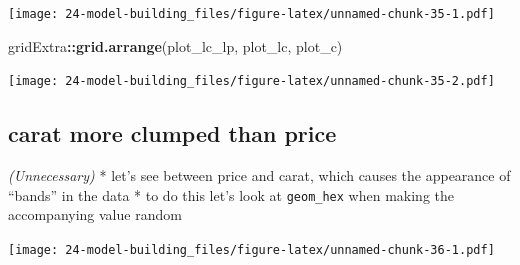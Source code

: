 \documentclass[]{book}
\newenvironment{Shaded}{\begin{snugshade}}{\end{snugshade}}
\newcommand{\DataTypeTok}[1]{\textcolor[rgb]{0.13,0.29,0.53}{#1}}
\newcommand{\KeywordTok}[1]{\textcolor[rgb]{0.13,0.29,0.53}{\textbf{#1}}}
\newcommand{\NormalTok}[1]{#1}
\newcommand{\OperatorTok}[1]{\textcolor[rgb]{0.81,0.36,0.00}{\textbf{#1}}}
\newcommand{\OtherTok}[1]{\textcolor[rgb]{0.56,0.35,0.01}{#1}}
\newcommand{\StringTok}[1]{\textcolor[rgb]{0.31,0.60,0.02}{#1}}
\theoremstyle{definition}
\theoremstyle{definition}
\theoremstyle{definition}
\theoremstyle{remark}
\begin{document}
\texttt{[image: 24-model-building\_files/figure-latex/unnamed-chunk-35-1.pdf]}

\begin{Shaded}
\begin{Highlighting}[]
\NormalTok{gridExtra}\OperatorTok{::}\KeywordTok{grid.arrange}\NormalTok{(plot_lc_lp, plot_lc, plot_c)}
\end{Highlighting}
\end{Shaded}

\texttt{[image: 24-model-building\_files/figure-latex/unnamed-chunk-35-2.pdf]}

\hypertarget{carat-more-clumped-than-price}{%
\subsection{carat more clumped than
price}\label{carat-more-clumped-than-price}}

\emph{(Unnecessary)} * let's see between price and carat, which causes
the appearance of ``bands'' in the data * to do this let's look at
\texttt{geom\_hex} when making the accompanying value random

\begin{Shaded}
\end{Shaded}

\texttt{[image: 24-model-building\_files/figure-latex/unnamed-chunk-36-1.pdf]}

\begin{Shaded}
\end{Shaded}
\end{document}
